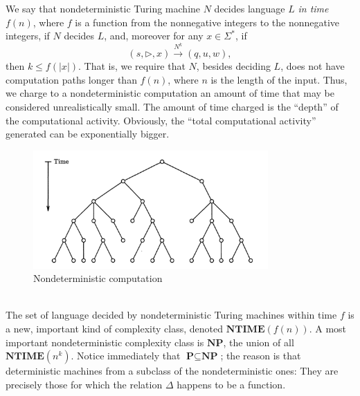 \documentclass[12pt]{article}
\begin{document}
We say that nondeterministic Turing machine $N$ decides language $L$ \textit{in time} $f(n)$, where $f$ is a function from the nonnegative integers to the nonnegative integers, if $N$ decides $L$, and, moreover for any $x \in \Sigma^*$, if 
\[
(s, \triangleright, x) \stackrel{N^k}{\rightarrow} (q, u, w),
\]
then $k \leq f(|x|)$. That is, we require that $N$, besides deciding $L$, does not have computation paths longer than $f(n)$, where $n$ is the length of the input. Thus, we charge to a nondeterministic computation an amount of time that may be considered unrealistically small. The amount of time charged is the ``depth'' of the computational activity. Obviously, the ``total computational activity'' generated can be exponentially bigger.
\begin{figure}[h]
    \centering
    \includegraphics[width=0.8\textwidth]{img/ndc.png}
    \caption{Nondeterministic computation}
    \label{fig:nondeterministic}
\end{figure}
\\
The set of language decided by nondeterministic Turing machines within time $f$ is a new, important kind of complexity class, denoted $\textbf{NTIME}(f(n))$. A most important nondeterministic complexity class is $\textbf{NP}$, the union of all $\textbf{NTIME}(n^k)$. Notice immediately that $\textbf{P}\subseteq\textbf{NP}$; the reason is that deterministic machines from a subclass of the nondeterministic ones: They are precisely those for which the relation $\Delta$ happens to be a function.
\end{document}
